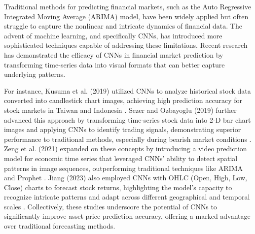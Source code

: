 \thesisspacing %

Traditional methods for predicting financial markets, such as the Auto Regressive Integrated Moving Average (ARIMA) model, have been widely applied but often struggle to capture the nonlinear and intricate dynamics of financial data. The advent of machine learning, and specifically CNNs, has introduced more sophisticated techniques capable of addressing these limitations. Recent research has demonstrated the efficacy of CNNs in financial market prediction by transforming time-series data into visual formats that can better capture underlying patterns.

For instance, Kusuma et al. (2019) utilized CNNs to analyze historical stock data converted into candlestick chart images, achieving high prediction accuracy for stock markets in Taiwan and Indonesia \cite{kusuma2019using}. Sezer and Ozbayoglu (2019) further advanced this approach by transforming time-series stock data into 2-D bar chart images and applying CNNs to identify trading signals, demonstrating superior performance to traditional methods, especially during bearish market conditions \cite{sezer2019financial}. Zeng et al. (2021) expanded on these concepts by introducing a video prediction model for economic time series that leveraged CNNs' ability to detect spatial patterns in image sequences, outperforming traditional techniques like ARIMA and Prophet \cite{zeng2021deep}. Jiang (2023) also employed CNNs with OHLC (Open, High, Low, Close) charts to forecast stock returns, highlighting the model's capacity to recognize intricate patterns and adapt across different geographical and temporal scales \cite{jiang2023reimagining}. Collectively, these studies underscore the potential of CNNs to significantly improve asset price prediction accuracy, offering a marked advantage over traditional forecasting methods.
